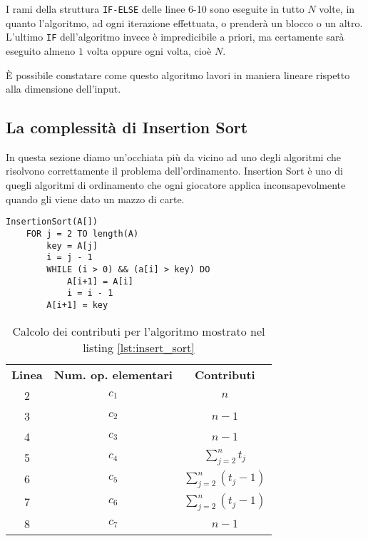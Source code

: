 \documentclass[11pt,a4paper,oneside]{article}
\begin{document}
I rami della struttura \texttt{IF-ELSE} delle linee 6-10 sono eseguite in tutto $N$ volte, in quanto l'algoritmo, ad ogni iterazione effettuata, o prenderà un blocco o un altro. L'ultimo \texttt{IF} dell'algoritmo invece è impredicibile a priori, ma certamente sarà eseguito almeno $1$ volta oppure ogni volta, cioè $N$.

È possibile constatare come questo algoritmo lavori in maniera lineare rispetto alla dimensione dell'input.

\subsection{La complessità di Insertion Sort}
In questa sezione diamo un'occhiata più da vicino ad uno degli algoritmi che risolvono correttamente il problema dell'ordinamento. Insertion Sort è uno di quegli algoritmi di ordinamento che ogni giocatore applica inconsapevolmente quando gli viene dato un mazzo di carte.
\pagebreak
\begin{lstlisting}[caption={Insertion Sort},label={lst:insert_sort}]
InsertionSort(A[])
	FOR j = 2 TO length(A)
		key = A[j]
		i = j - 1
		WHILE (i > 0) && (a[i] > key) DO
			A[i+1] = A[i]
			i = i - 1
		A[i+1] = key
\end{lstlisting}

\begin{table}[hb]
	\centering
	\begin{tabular}{ c | c | c }
		\textbf{Linea} & \textbf{Num. op. elementari} & \textbf{Contributi} \\ 
		2 & $c_1$ & $n$ \\
		3 & $c_2$ & $n-1$ \\
		4 & $c_3$ & $n-1$ \\ 
		5 & $c_4$ & $\sum_{j=2}^{n}t_j$ \\
		6 & $c_5$ & $\sum_{j=2}^{n}(t_j-1)$ \\
		7 & $c_6$ & $\sum_{j=2}^{n}(t_j-1)$ \\
		8 & $c_7$ & $n-1$ \\ 
	\end{tabular}
	\caption{Calcolo dei contributi per l'algoritmo mostrato nel listing \ref{lst:insert_sort}}
	\label{tbl:insert_sort}
\end{table}
\end{document}
